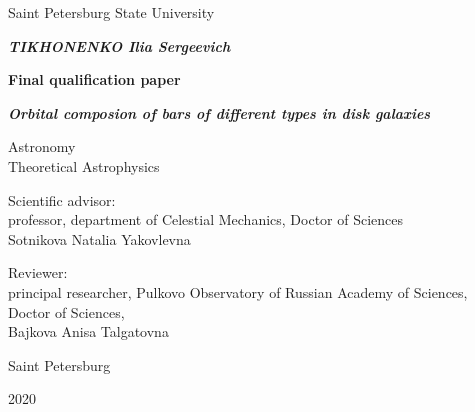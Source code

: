 \begin{titlepage}
  \centering
  {Saint Petersburg State University \par}
  
  \vspace{2cm}

  {\bfseries \itshape\MakeUppercase{Tikhonenko} Ilia Sergeevich\par}
  \vspace{0.5\baselineskip}
  {\bfseries Final qualification paper\par}
  \vspace{0.5\baselineskip}
  {\bfseries \itshape Orbital composion of bars of different types in disk galaxies\par}
  \vspace{2cm}
  {
    \begin{spacing}{1.0}
    ${}$\\ 
    ${}$\\
    Astronomy\\
    Theoretical Astrophysics
    \end{spacing}
  }
  \vspace{1cm}
  \begin{flushright}
    \parbox{0.5\textwidth}{
    \singlespacing
      {Scientific advisor:} \\
      professor, department of Celestial Mechanics, Doctor of Sciences\\
      Sotnikova Natalia Yakovlevna
    }
  \end{flushright}
  \par
  \begin{flushright}
    \parbox{0.5\textwidth}{
    \singlespacing
      {Reviewer:} \\
      principal researcher, Pulkovo Observatory of Russian Academy of Sciences,
      Doctor of Sciences,\\
      Bajkova Anisa Talgatovna
    }
  \end{flushright}
  
  \vfill
  
  {Saint Petersburg \par}
  {2020}
\end{titlepage}
